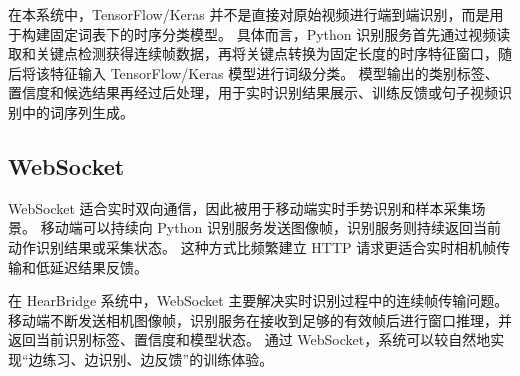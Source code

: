 在本系统中，TensorFlow/Keras 并不是直接对原始视频进行端到端识别，而是用于构建固定词表下的时序分类模型。
具体而言，Python 识别服务首先通过视频读取和关键点检测获得连续帧数据，再将关键点转换为固定长度的时序特征窗口，随后将该特征输入 TensorFlow/Keras 模型进行词级分类。
模型输出的类别标签、置信度和候选结果再经过后处理，用于实时识别结果展示、训练反馈或句子视频识别中的词序列生成。

\subsection{WebSocket}

WebSocket 适合实时双向通信，因此被用于移动端实时手势识别和样本采集场景。
移动端可以持续向 Python 识别服务发送图像帧，识别服务则持续返回当前动作识别结果或采集状态。
这种方式比频繁建立 HTTP 请求更适合实时相机帧传输和低延迟结果反馈。

在 HearBridge 系统中，WebSocket 主要解决实时识别过程中的连续帧传输问题。
移动端不断发送相机图像帧，识别服务在接收到足够的有效帧后进行窗口推理，并返回当前识别标签、置信度和模型状态。
通过 WebSocket，系统可以较自然地实现“边练习、边识别、边反馈”的训练体验。

